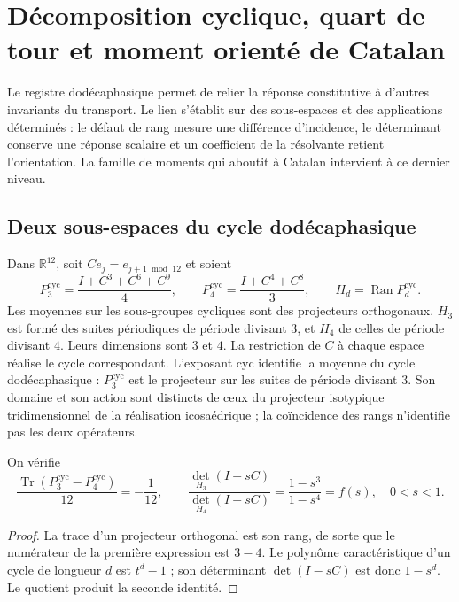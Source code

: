 \section{Décomposition cyclique, quart de tour et moment orienté de Catalan}
\label{iii:iii:sec:catalan}

Le registre dodécaphasique permet de relier la réponse constitutive à
d’autres invariants du transport. Le lien s’établit sur des sous-espaces
et des applications déterminés : le défaut de rang mesure une différence
d’incidence, le déterminant conserve une réponse scalaire et un coefficient
de la résolvante retient l’orientation. La famille de moments qui aboutit
à Catalan intervient à ce dernier niveau.

\subsection{Deux sous-espaces du cycle dodécaphasique}

Dans $\mathbb R^{12}$, soit $C e_j=e_{j+1\bmod12}$ et soient
\begin{equation}
 P_3^{\mathrm{cyc}}=\frac{I+C^3+C^6+C^9}{4},\qquad
 P_4^{\mathrm{cyc}}=\frac{I+C^4+C^8}{3},\qquad
 H_d=\operatorname{Ran}P_d^{\mathrm{cyc}}.
 \label{iii:iii:eq:projectors34}
\end{equation}
Les moyennes sur les sous-groupes cycliques sont des projecteurs orthogonaux.
$H_3$ est formé des suites périodiques de période divisant $3$,
et $H_4$ de celles de période divisant $4$. Leurs dimensions sont $3$ et $4$.
La restriction de $C$ à chaque espace réalise le cycle correspondant.
L’exposant $\mathrm{cyc}$ identifie la moyenne du cycle dodécaphasique :
$P_3^{\mathrm{cyc}}$ est le projecteur sur les suites de période divisant
$3$. Son domaine et son action sont distincts de ceux du projecteur isotypique
tridimensionnel de la réalisation icosaédrique ; la coïncidence des rangs
n’identifie pas les deux opérateurs.

\begin{proposition}
On vérifie
\begin{equation}
 \frac{\operatorname{Tr}(P_3^{\mathrm{cyc}}-P_4^{\mathrm{cyc}})}{12}=-\frac1{12},\qquad
 \frac{\det_{H_3}(I-sC)}{\det_{H_4}(I-sC)}
 =\frac{1-s^3}{1-s^4}=f(s),\quad 0<s<1.
 \label{iii:iii:eq:trace-det}
\end{equation}
\end{proposition}
\begin{proof}
La trace d’un projecteur orthogonal est son rang, de sorte que le numérateur
de la première expression est $3-4$. Le polynôme caractéristique d’un cycle
de longueur $d$ est $t^d-1$ ; son déterminant $\det(I-sC)$ est donc
$1-s^d$. Le quotient produit la seconde identité.
\end{proof}

